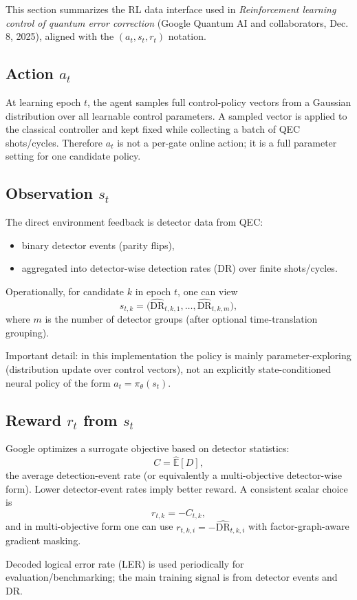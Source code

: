 \documentclass[11pt]{article}
\begin{document}
This section summarizes the RL data interface used in \emph{Reinforcement learning control of quantum error correction} (Google Quantum AI and collaborators, Dec. 8, 2025), aligned with the $(a_t,s_t,r_t)$ notation.

\subsection*{Action $a_t$}
At learning epoch $t$, the agent samples full control-policy vectors from a Gaussian distribution over all learnable control parameters. A sampled vector is applied to the classical controller and kept fixed while collecting a batch of QEC shots/cycles. Therefore $a_t$ is not a per-gate online action; it is a full parameter setting for one candidate policy.

\subsection*{Observation $s_t$}
The direct environment feedback is detector data from QEC:
\begin{itemize}
\item binary detector events (parity flips),
\item aggregated into detector-wise detection rates (DR) over finite shots/cycles.
\end{itemize}
Operationally, for candidate $k$ in epoch $t$, one can view
\[
s_{t,k}=\big(\widehat{\mathrm{DR}}_{t,k,1},\ldots,\widehat{\mathrm{DR}}_{t,k,m}\big),
\]
where $m$ is the number of detector groups (after optional time-translation grouping).

Important detail: in this implementation the policy is mainly parameter-exploring (distribution update over control vectors), not an explicitly state-conditioned neural policy of the form $a_t=\pi_\theta(s_t)$.

\subsection*{Reward $r_t$ from $s_t$}
Google optimizes a surrogate objective based on detector statistics:
\[
C=\hat{\mathbb{E}}[D],
\]
the average detection-event rate (or equivalently a multi-objective detector-wise form). Lower detector-event rates imply better reward. A consistent scalar choice is
\[
r_{t,k}=-C_{t,k},
\]
and in multi-objective form one can use $r_{t,k,i}=-\widehat{\mathrm{DR}}_{t,k,i}$ with factor-graph-aware gradient masking.

Decoded logical error rate (LER) is used periodically for evaluation/benchmarking; the main training signal is from detector events and DR.
\end{document}
